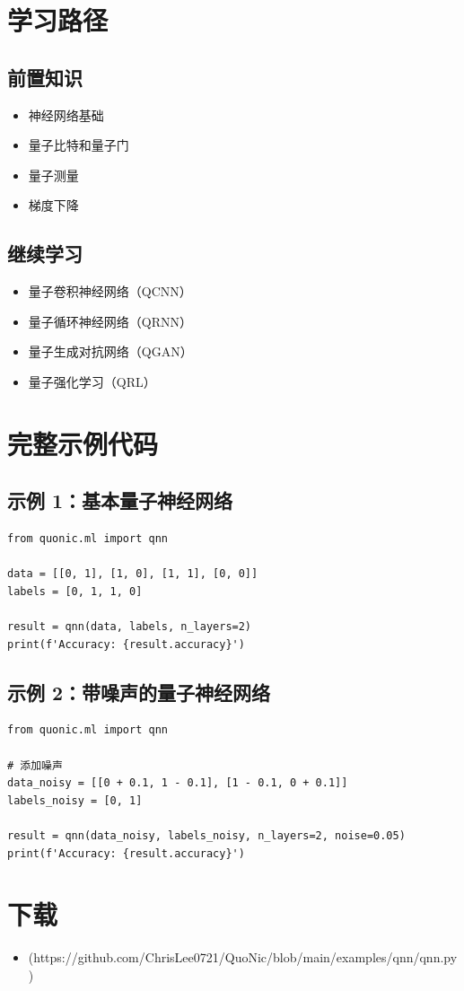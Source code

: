 \documentclass[12pt,a4paper]{article}
\begin{document}
\section{学习路径}

\subsection{前置知识}
\begin{itemize}
  \item 神经网络基础
  \item 量子比特和量子门
  \item 量子测量
  \item 梯度下降
\end{itemize}

\subsection{继续学习}
\begin{itemize}
  \item 量子卷积神经网络（QCNN）
  \item 量子循环神经网络（QRNN）
  \item 量子生成对抗网络（QGAN）
  \item 量子强化学习（QRL）
\end{itemize}

\section{完整示例代码}

\subsection{示例 1：基本量子神经网络}

\begin{verbatim}
from quonic.ml import qnn

data = [[0, 1], [1, 0], [1, 1], [0, 0]]
labels = [0, 1, 1, 0]

result = qnn(data, labels, n_layers=2)
print(f'Accuracy: {result.accuracy}')
\end{verbatim}

\subsection{示例 2：带噪声的量子神经网络}

\begin{verbatim}
from quonic.ml import qnn

# 添加噪声
data_noisy = [[0 + 0.1, 1 - 0.1], [1 - 0.1, 0 + 0.1]]
labels_noisy = [0, 1]

result = qnn(data_noisy, labels_noisy, n_layers=2, noise=0.05)
print(f'Accuracy: {result.accuracy}')
\end{verbatim}

\section{下载}

\begin{itemize}
  \item [qnn.py](https://github.com/ChrisLee0721/QuoNic/blob/main/examples/qnn/qnn.py)
\end{itemize}
\end{document}
